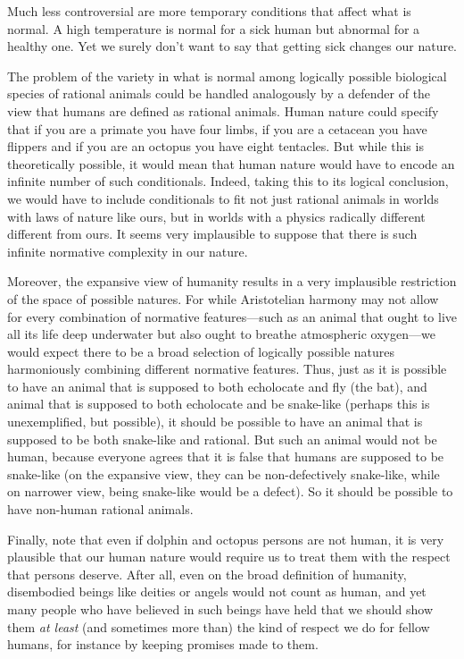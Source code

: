 Much less controversial are more temporary conditions that affect what is normal. A high temperature is normal for a sick human but abnormal for a
healthy one. Yet we surely don't want to say that getting sick changes our nature.

The problem of the variety in what is normal among logically possible biological species of rational animals could be handled analogously
by a defender of the view that humans are defined as rational animals. 
Human nature could specify that if you are a primate you have four limbs, if you are a cetacean you have flippers and if you are an octopus you have
eight tentacles. But while this is theoretically possible, it would mean that human nature would have to encode an infinite number of such conditionals.
Indeed, taking this to its logical conclusion, we would have to include conditionals to fit not just rational animals in worlds with laws of nature like ours,
but in worlds with a physics radically different different from ours. It seems very implausible to suppose that there is such infinite normative complexity
in our nature.

Moreover, the expansive view of humanity results in a very implausible restriction of the space of possible natures. For while Aristotelian harmony may not
allow for every combination of normative features---such as an animal that ought to live all its life deep underwater but also ought to breathe atmospheric 
oxygen---we would expect there to be a broad selection of logically possible natures harmoniously combining different normative features. Thus, just as it
is possible to have an animal that is supposed to both echolocate and fly (the bat), and animal that is supposed to both echolocate and be snake-like (perhaps
this is unexemplified, but possible), it should
be possible to have an animal that is supposed to be both snake-like and rational. But such an animal would not be human, because everyone 
agrees that it is false that humans are supposed
to be snake-like (on the expansive view, they can be non-defectively snake-like, while on narrower view, being snake-like would be a defect). So 
it should be possible to have non-human rational animals.

Finally, note that even if dolphin and octopus persons are not human, it is very plausible that our human nature would require us to treat them with the
respect that persons deserve. After all, even on the broad definition of humanity, disembodied beings like deities or angels would not count as human, and yet
many people who have believed in such beings have held that we should show them \textit{at least} (and sometimes more than) the 
kind of respect we do for fellow humans, for instance by keeping promises made to them.


